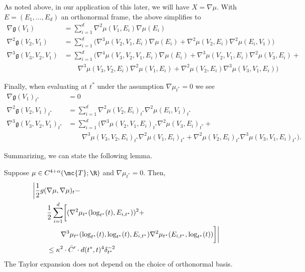 \documentclass{article}
\begin{document}
As noted above, in our application of this later, we will have $X=\nabla \mu$. With $E=(E_1, \dots, E_d)$ an orthonormal frame, the above simplifies to
$$
\begin{aligned}
\nabla \mathfrak{g}(V_1) &= \sum_{i=1}^d \nabla^2 \mu(V_1, E_i) \nabla \mu(E_i) \\
\nabla^2 \mathfrak{g}(V_2, V_1) &= \sum_{i=1}^d 
\biggl(\nabla^3 \mu(V_2, V_1, E_i) \nabla \mu(E_i) + \nabla^2 \mu(V_2, E_i) \nabla^2 \mu(E_i, V_1) \biggr) \\
  \nabla^3 \mathfrak{g}(V_3, V_2, V_1)& = \sum_{i=1}^d
\biggl(\nabla^4 \mu(V_3, V_2, V_1, E_i) \nabla \mu(E_i) + \nabla^3  \mu(V_2, V_1, E_i) \nabla^2 \mu(V_3, E_i) +  \\
  & \qquad \nabla^3 \mu(V_3, V_2, E_i) \nabla^2 \mu(V_1, E_i) +  \nabla^2 \mu(V_2, E_i) \nabla^3 \mu(V_3, V_1, E_i) \biggr)
\end{aligned}
$$

Finally, when evaluating at $t^*$ under the assumption $\nabla \mu_{t^*}=0$ we see
\begin{equation}
  \label{eq:grad:density}
\begin{aligned}
\nabla \mathfrak{g}(V_1)_{t^*} &= 0 \\
\nabla^2 \mathfrak{g}(V_2, V_1)_{t^*} &= \sum_{i=1}^d 
 \nabla^2 \mu(V_2, E_i)_{t^*} \nabla^2 \mu(E_i, V_1)_{t^*} \\
  \nabla^3 \mathfrak{g}(V_3, V_2, V_1)_{t^*}& = \sum_{i=1}^d
\biggl(\nabla^3  \mu(V_2, V_1, E_i)_{t^*} \nabla^2 \mu(V_3, E_i)_{t^*} +  \\
  & \qquad \nabla^3 \mu(V_3, V_2, E_i)_{t^*} \nabla^2 \mu(V_1, E_i)_{t^*} +  \nabla^2 \mu(V_2, E_i)_{t^*} \nabla^3 \mu(V_3, V_1, E_i)_{t^*} \biggr).
\end{aligned}
\end{equation}

Summarizing, we can state the following lemma.
\begin{lemma}
\label{lem:grad:density}
  Suppose $\mu \in C^{4+\alpha}(\mc{T};\R)$ and $\nabla \mu_{t^*}=0$. Then, 
  \begin{equation}
\begin{aligned}
\lefteqn{    \biggl| \frac{1}{2} g(\nabla \mu, \nabla \mu)_t -  } \\
& \qquad  \frac{1}{2}\sum_{i=1}^d \biggl[ (\nabla^2 \mu_{t^*}(\log_{t^*}(t), E_{i,t^*}))^2 + \\
    & \qquad \qquad 
      \nabla^3 \mu_{t^*}(\log_{t^*}(t), \log_{t^*}(t), E_{i,t^*}) \nabla^2 \mu_{t^*}(E_{i,t^*}, \log_{t^*}(t)) \biggr] \biggr| \\
& \qquad \leq \kappa^2 \cdot \bar{C}' \cdot d(t^*,t)^4 \delta_{t^*}^{-2}
\end{aligned}
    \end{equation}
The Taylor expansion does not depend on the choice of orthonormal basis.
  \end{lemma}
\end{document}
